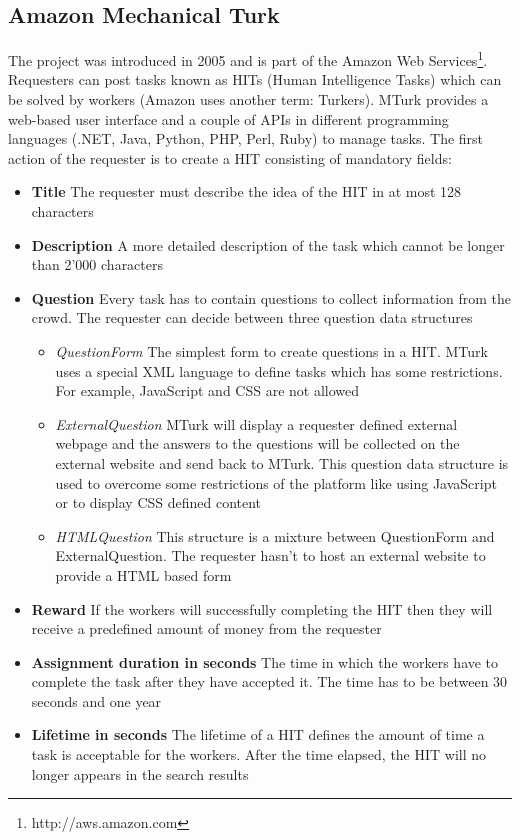 \subsection{Amazon Mechanical Turk}
The project was introduced in 2005 and is part of the Amazon Web Services\footnote{http://aws.amazon.com}. Requesters can post tasks known as HITs (Human Intelligence Tasks) which can be solved by workers (Amazon uses another term: Turkers). MTurk provides a web-based user interface and a couple of APIs in different programming languages (.NET, Java, Python, PHP, Perl, Ruby) to manage tasks. The first action of the requester is to create a HIT consisting of mandatory fields: 
\begin{itemize}
	\item \textbf{Title} The requester must describe the idea of the HIT in at most 128 characters 
	\item \textbf{Description} A more detailed description of the task which cannot be longer than 2'000 characters 
	\item \textbf{Question} Every task has to contain questions to collect information from the crowd. The requester can decide between three question data structures 
	\begin{itemize}
		\item \textit{QuestionForm} The simplest form to create questions in a HIT. MTurk uses a special XML language to define tasks which has some restrictions. For example, JavaScript and CSS are not allowed 
		\item \textit{ExternalQuestion} MTurk will display a requester defined external webpage and the answers to the questions will be collected on the external website and send back to MTurk. This question data structure is used to overcome some restrictions of the platform like using JavaScript or to display CSS defined content 
		\item \textit{HTMLQuestion} This structure is a mixture between QuestionForm and ExternalQuestion. The requester hasn't to host an external website to provide a HTML based form 
	\end{itemize}
	\item \textbf{Reward} If the workers will successfully completing the HIT then they will receive a predefined amount of money from the requester 
	\item \textbf{Assignment duration in seconds} The time in which the workers have to complete the task after they have accepted it. The time has to be between 30 seconds and one year 
	\item \textbf{Lifetime in seconds} The lifetime of a HIT defines the amount of time a task is acceptable for the workers. After the time elapsed, the HIT will no longer appears in the search results 
\end{itemize}
